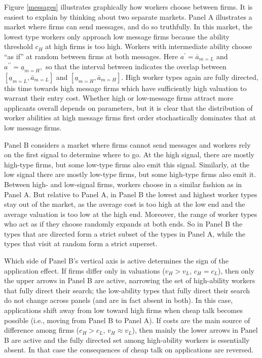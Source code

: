 \documentclass[12pt]{article}
\begin{document}
Figure \ref{messages} illustrates graphically how workers choose between
firms. It is easiest to explain by thinking about two separate markets.
Panel A illustrates a market where firms can send messages, and do so
truthfully. In this market, the lowest type workers only approach low
message firms because the ability threshold $c_{H}$ at high firms is too
high. Workers with intermediate ability choose ``as if'' at random between
firms at both messages. Here $a^{\prime }=\bar{a}_{m=L}$ and $a^{\prime
\prime }=\underline{a}_{m=H},$ so that the interval between indicates the
overlap between $[\underline{a}_{m=L},\bar{a}_{m=L}]$ and $[\underline{a}%
_{m=H},\bar{a}_{m=H}]$. High worker types again are fully directed, this
time towards high message firms which have sufficiently high valuation to
warrant their entry cost. Whether high or low-message firms attract more
applicants overall depends on parameters, but it is clear that the
distribution of worker abilities at high message firms first order
stochastically dominates that at low message firms.

Panel B considers a market where firms cannot send messages and workers rely on the first signal to determine where to go. At the high signal, there are mostly high-type firms, but some low-type firms also emit this signal. Similarly, at the low signal there are mostly low-type firms, but some high-type firms also emit it. Between high- and low-signal firms, workers choose in a similar fashion as in Panel A. But relative to Panel A, in Panel B the lowest and highest worker types stay out of the market, as the average cost is too high at the low end and the average valuation is too low at the high end. Moreover, the range of worker types who act as if they choose randomly expands at both ends. So in Panel B the types that are directed form a strict subset of the types in Panel A, while the types that visit at random form a strict superset.

Which side of Panel B's vertical axis is active determines the sign of the application effect. If firms differ only in valuations ($v_H > v_L$, $c_H = c_L$), then only the upper arrows in Panel B are active, narrowing the set of high-ability workers that fully direct their search; the low-ability types that fully direct their search do not change across panels (and are in fact absent in both). In this case, applications shift away from low toward high firms when cheap talk becomes possible (i.e., moving from Panel B to Panel A). If costs are the main source of difference among firms ($c_H > c_L$, $v_H \approx v_L$), then mainly the lower arrows in Panel B are active and the fully directed set among high-ability workers is essentially absent. In that case the consequences of cheap talk on applications are reversed.
\end{document}

